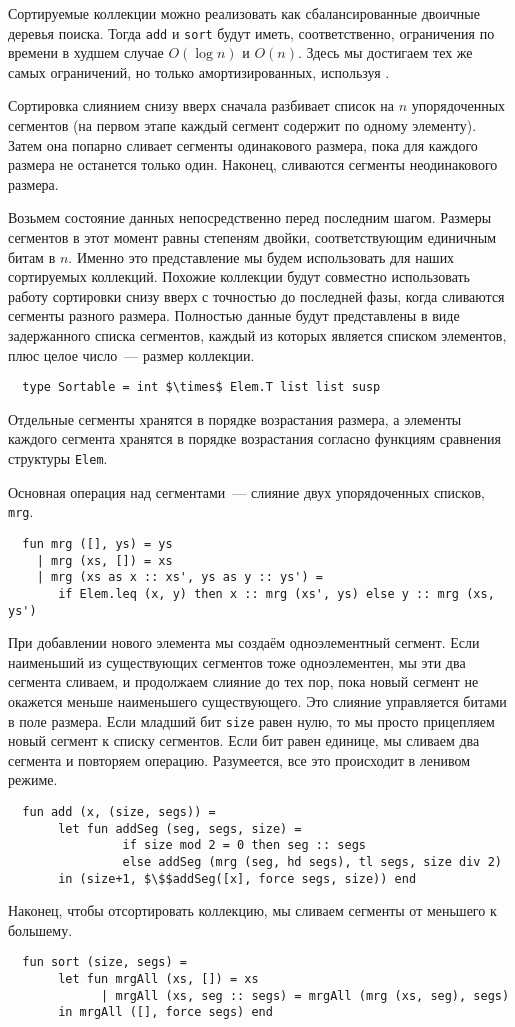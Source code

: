 Сортируемые коллекции можно реализовать как сбалансированные двоичные
деревья поиска. Тогда \lstinline!add! и \lstinline!sort! будут иметь,
соответственно, ограничения по времени в худшем случае $O(\log n)$ и
$O(n)$. Здесь мы достигаем тех же самых ограничений, но только
амортизированных, используя .

Сортировка слиянием снизу вверх сначала разбивает список на $n$
упорядоченных сегментов (на первом этапе каждый сегмент содержит по
одному элементу). Затем она попарно сливает сегменты одинакового
размера, пока для каждого размера не останется только один. Наконец,
сливаются сегменты неодинакового размера.

Возьмем состояние данных непосредственно перед последним
шагом. Размеры сегментов в этот момент равны степеням двойки,
соответствующим единичным битам в $n$.  Именно это представление мы
будем использовать для наших сортируемых коллекций.  Похожие коллекции
будут совместно использовать работу сортировки снизу вверх с точностью
до последней фазы, когда сливаются сегменты разного размера.
Полностью данные будут представлены в виде задержанного списка
сегментов, каждый из которых является списком элементов, плюс целое
число~--- размер коллекции.
\begin{lstlisting}
  type Sortable = int $\times$ Elem.T list list susp
\end{lstlisting}
Отдельные сегменты хранятся в порядке возрастания размера, а элементы
каждого сегмента хранятся в порядке возрастания согласно функциям
сравнения структуры \lstinline!Elem!.

Основная операция над сегментами~--- слияние двух упорядоченных
списков, \lstinline{mrg}.
\begin{lstlisting}
  fun mrg ([], ys) = ys
    | mrg (xs, []) = xs
    | mrg (xs as x :: xs', ys as y :: ys') =
       if Elem.leq (x, y) then x :: mrg (xs', ys) else y :: mrg (xs, ys')
\end{lstlisting}
При добавлении нового элемента мы создаём одноэлементный сегмент. Если
наименьший из существующих сегментов тоже одноэлементен, мы эти два
сегмента сливаем, и продолжаем слияние до тех пор, пока новый сегмент
не окажется меньше наименьшего существующего. Это слияние управляется
битами в поле размера. Если младший бит \lstinline!size! равен нулю, то
мы просто прицепляем новый сегмент к списку сегментов. Если бит равен
единице, мы сливаем два сегмента и повторяем операцию. Разумеется, все
это происходит в ленивом режиме.
\begin{lstlisting}
  fun add (x, (size, segs)) =
       let fun addSeg (seg, segs, size) =
                if size mod 2 = 0 then seg :: segs
                else addSeg (mrg (seg, hd segs), tl segs, size div 2)
       in (size+1, $\$$addSeg([x], force segs, size)) end
\end{lstlisting}
Наконец, чтобы отсортировать коллекцию, мы сливаем сегменты от
меньшего к большему.
\begin{lstlisting}
  fun sort (size, segs) =
       let fun mrgAll (xs, []) = xs
             | mrgAll (xs, seg :: segs) = mrgAll (mrg (xs, seg), segs)
       in mrgAll ([], force segs) end
\end{lstlisting}

